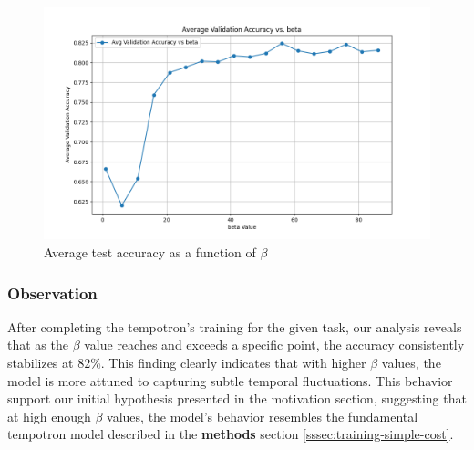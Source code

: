 \begin{figure}[H]
    \centering
    \includegraphics[width=0.8\linewidth]{results/graphs/beta-validation.png}
    \caption{Average test accuracy as a function of $\beta$}
    \label{fig:beta-validation}
\end{figure}


\subsubsection{Observation}

After completing the tempotron's training for the given task, our analysis reveals that as the $\beta$ value reaches and exceeds a specific point, the accuracy consistently stabilizes at 82\%. This finding clearly indicates that with higher $\beta$ values, the model is more attuned to capturing subtle temporal fluctuations. This behavior support our initial hypothesis presented in the motivation section, suggesting that at high enough $\beta$ values, the model's behavior resembles the fundamental tempotron model described in the \textbf{methods} section \ref{sssec:training-simple-cost}.